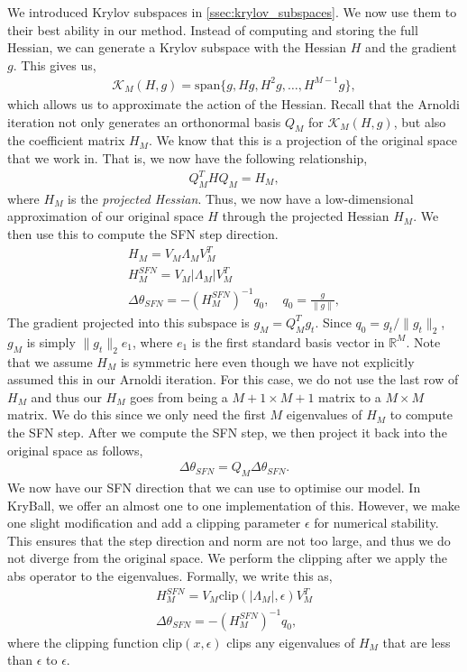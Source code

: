 We introduced Krylov subspaces in \cref{ssec:krylov_subspaces}. We now use them to their best ability in our method. Instead of computing and storing the full Hessian, we can generate a Krylov subspace with the Hessian $H$ and the gradient $g$. This gives us,
\begin{align}
    \mathcal{K}_{M}(H, g) = \text{span} \{g, H g, H^2 g, \ldots, H^{M-1} g \}, 
\end{align}
which allows us to approximate the action of the Hessian. Recall that the Arnoldi iteration not only generates an orthonormal basis $Q_M$ for $\mathcal{K}_{M}(H, g)$, but also the coefficient matrix $H_M$. We know that this is a projection of the original space that we work in. That is, we now have the following relationship,
\begin{align}
    Q_M^T H Q_M = H_M,
\end{align}
where $H_M$ is the \textit{projected Hessian}. Thus, we now have a low-dimensional approximation of our original space $H$ through the projected Hessian $H_M$. We then use this to compute the SFN step direction.
\begin{align}
    H_M = V_M \Lambda_M V_M^T \\
    H_M^{SFN} = V_M |\Lambda_M| V_M^T \\
    \Delta \theta_{SFN} = -(H_M^{SFN})^{-1} q_0, \quad q_0 = \frac{g}{\| g \|},
\end{align}
The gradient projected into this subspace is $g_M = Q_M^T g_t$. Since $q_0 = g_t/\|g_t\|_2$, $g_M$ is simply $\|g_t\|_2 e_1$, where $e_1$ is the first standard basis vector in $\mathbb{R}^M$. Note that we assume $H_M$ is symmetric here even though we have not explicitly assumed this in our Arnoldi iteration. For this case, we do not use the last row of $H_M$ and thus our $H_M$ goes from being a $M+1 \times M+1$ matrix to a $M \times M$ matrix. We do this since we only need the first $M$ eigenvalues of $H_M$ to compute the SFN step. After we compute the SFN step, we then project it back into the original space as follows,
\begin{align}
    \Delta \theta_{SFN} = Q_M \Delta \theta_{SFN}.
\end{align}
We now have our SFN direction that we can use to optimise our model. In KryBall, we offer an almost one to one implementation of this. However, we make one slight modification and add a clipping parameter $\epsilon$ for numerical stability. This ensures that the step direction and norm are not too large, and thus we do not diverge from the original space. We perform the clipping after we apply the abs operator to the eigenvalues. Formally, we write this as,
\begin{align}
    H_M^{SFN} = V_M \text{clip}(|\Lambda_M|, \epsilon) V_M^T \\
    \Delta \theta_{SFN} = -(H_M^{SFN})^{-1} q_0,
\end{align}
where the clipping function $\text{clip}(x, \epsilon)$ clips any eigenvalues of $H_M$ that are less than $\epsilon$ to $\epsilon$.

